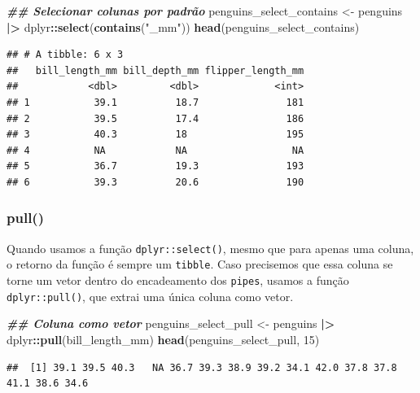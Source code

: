 \documentclass[
]{article}
\newenvironment{Shaded}{\begin{snugshade}}{\end{snugshade}}
\newcommand{\DecValTok}[1]{\textcolor[rgb]{0.00,0.00,0.81}{#1}}
\newcommand{\DocumentationTok}[1]{\textcolor[rgb]{0.56,0.35,0.01}{\textbf{\textit{#1}}}}
\newcommand{\FunctionTok}[1]{\textcolor[rgb]{0.13,0.29,0.53}{\textbf{#1}}}
\newcommand{\NormalTok}[1]{#1}
\newcommand{\OtherTok}[1]{\textcolor[rgb]{0.56,0.35,0.01}{#1}}
\newcommand{\SpecialCharTok}[1]{\textcolor[rgb]{0.81,0.36,0.00}{\textbf{#1}}}
\newcommand{\StringTok}[1]{\textcolor[rgb]{0.31,0.60,0.02}{#1}}
\begin{document}
\begin{Shaded}
\begin{Highlighting}[]
\DocumentationTok{\#\# Selecionar colunas por padrão}
\NormalTok{penguins\_select\_contains }\OtherTok{\textless{}{-}}\NormalTok{ penguins }\SpecialCharTok{|\textgreater{}} 
\NormalTok{    dplyr}\SpecialCharTok{::}\FunctionTok{select}\NormalTok{(}\FunctionTok{contains}\NormalTok{(}\StringTok{"\_mm"}\NormalTok{))}
\FunctionTok{head}\NormalTok{(penguins\_select\_contains)}
\end{Highlighting}
\end{Shaded}

\begin{verbatim}
## # A tibble: 6 x 3
##   bill_length_mm bill_depth_mm flipper_length_mm
##            <dbl>         <dbl>             <int>
## 1           39.1          18.7               181
## 2           39.5          17.4               186
## 3           40.3          18                 195
## 4           NA            NA                  NA
## 5           36.7          19.3               193
## 6           39.3          20.6               190
\end{verbatim}

\hypertarget{pull}{%
\subsubsection{pull()}\label{pull}}

Quando usamos a função \texttt{dplyr::select()}, mesmo que para apenas uma coluna, o retorno da função é sempre um \texttt{tibble}. Caso precisemos que essa coluna se torne um vetor dentro do encadeamento dos \texttt{pipes}, usamos a função \texttt{dplyr::pull()}, que extrai uma única coluna como vetor.

\begin{Shaded}
\begin{Highlighting}[]
\DocumentationTok{\#\# Coluna como vetor}
\NormalTok{penguins\_select\_pull }\OtherTok{\textless{}{-}}\NormalTok{ penguins }\SpecialCharTok{|\textgreater{}} 
\NormalTok{    dplyr}\SpecialCharTok{::}\FunctionTok{pull}\NormalTok{(bill\_length\_mm)}
\FunctionTok{head}\NormalTok{(penguins\_select\_pull, }\DecValTok{15}\NormalTok{)}
\end{Highlighting}
\end{Shaded}

\begin{verbatim}
##  [1] 39.1 39.5 40.3   NA 36.7 39.3 38.9 39.2 34.1 42.0 37.8 37.8 41.1 38.6 34.6
\end{verbatim}
\end{document}

